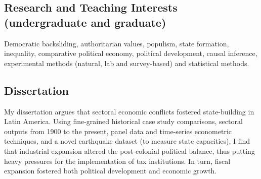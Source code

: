 \subsection*{Research and Teaching Interests (undergraduate and graduate)}

Democratic backsliding, authoritarian values, populism, state formation, inequality, comparative political economy, political development, causal inference, experimental methods (natural, lab and survey-based) and statistical methods.

\subsection*{Dissertation}

	My dissertation argues that sectoral economic conflicts fostered state-building in Latin America. Using fine-grained historical case study comparisons, sectoral outputs from 1900 to the present, panel data and time-series econometric techniques, and a novel earthquake dataset (to measure state capacities), I find that industrial expansion altered the post-colonial political balance, thus putting heavy pressures for the implementation of tax institutions. In turn, fiscal expansion fostered both political development and economic growth.
